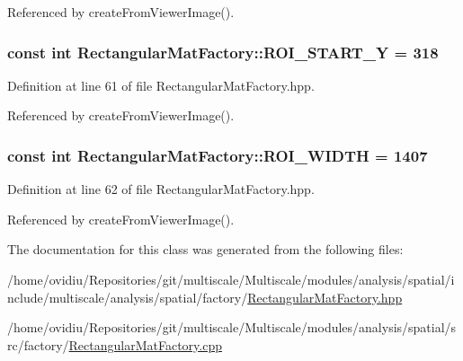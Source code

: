\-Referenced by create\-From\-Viewer\-Image().

\hypertarget{classmultiscale_1_1analysis_1_1RectangularMatFactory_a1a25934dba59fe883d88e9735eb33db6}{
\subsubsection[{\-R\-O\-I\-\_\-\-S\-T\-A\-R\-T\-\_\-\-Y}]{\setlength{\rightskip}{0pt plus 5cm}const int {\bf \-Rectangular\-Mat\-Factory\-::\-R\-O\-I\-\_\-\-S\-T\-A\-R\-T\-\_\-\-Y} = 318}}\label{classmultiscale_1_1analysis_1_1RectangularMatFactory_a1a25934dba59fe883d88e9735eb33db6}


\-Definition at line 61 of file \-Rectangular\-Mat\-Factory.\-hpp.



\-Referenced by create\-From\-Viewer\-Image().

\hypertarget{classmultiscale_1_1analysis_1_1RectangularMatFactory_aeb6f19ae65802df5f876cd0e15b27a48}{
\subsubsection[{\-R\-O\-I\-\_\-\-W\-I\-D\-T\-H}]{\setlength{\rightskip}{0pt plus 5cm}const int {\bf \-Rectangular\-Mat\-Factory\-::\-R\-O\-I\-\_\-\-W\-I\-D\-T\-H} = 1407}}\label{classmultiscale_1_1analysis_1_1RectangularMatFactory_aeb6f19ae65802df5f876cd0e15b27a48}


\-Definition at line 62 of file \-Rectangular\-Mat\-Factory.\-hpp.



\-Referenced by create\-From\-Viewer\-Image().



\-The documentation for this class was generated from the following files\-:\begin{DoxyCompactItemize}
\item 
/home/ovidiu/\-Repositories/git/multiscale/\-Multiscale/modules/analysis/spatial/include/multiscale/analysis/spatial/factory/\hyperlink{RectangularMatFactory_8hpp}{\-Rectangular\-Mat\-Factory.\-hpp}\item 
/home/ovidiu/\-Repositories/git/multiscale/\-Multiscale/modules/analysis/spatial/src/factory/\hyperlink{RectangularMatFactory_8cpp}{\-Rectangular\-Mat\-Factory.\-cpp}\end{DoxyCompactItemize}
